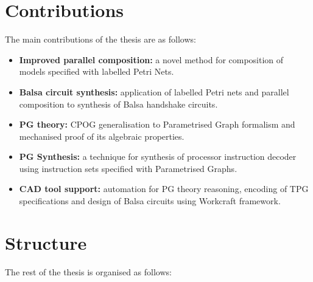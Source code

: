 \section{Contributions}

The main contributions of the thesis are as follows:

\begin{itemize}
\item
\textbf{Improved parallel composition:} a novel method for composition of models specified with labelled Petri Nets.

\item
\textbf{Balsa circuit synthesis:} application of labelled Petri nets and parallel composition to synthesis of Balsa handshake circuits.

\item
\textbf{PG theory:} CPOG generalisation to Parametrised Graph formalism and mechanised proof of its algebraic properties.

\item
\textbf{PG Synthesis:} a technique for synthesis of processor instruction decoder using instruction sets specified with Parametrised Graphs.

\item
\textbf{CAD tool support:} automation for PG theory reasoning, encoding of TPG specifications and design of Balsa circuits using Workcraft framework.

\end{itemize}

\section{Structure}

The rest of the thesis is organised as follows:

